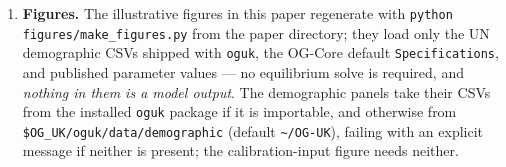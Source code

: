 \begin{enumerate}
\item \textbf{Figures.} The illustrative figures in this paper regenerate with \texttt{python figures/\allowbreak make\_\allowbreak figures.py} from the paper directory; they load only the UN demographic CSVs shipped with \texttt{oguk}, the OG-Core default \texttt{Specifications}, and published parameter values --- no equilibrium solve is required, and \emph{nothing in them is a model output}. The demographic panels take their CSVs from the installed \texttt{oguk} package if it is importable, and otherwise from \texttt{\$OG\_UK/oguk/data/demographic} (default \texttt{\textasciitilde/OG-UK}), failing with an explicit message if neither is present; the calibration-input figure needs neither.
\end{enumerate}

